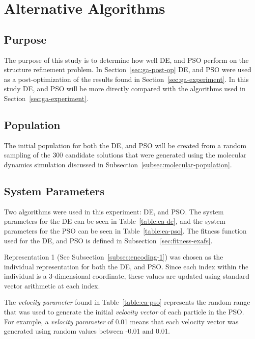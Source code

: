 \section{Alternative Algorithms}

\subsection{Purpose}

The purpose of this study is to determine how well DE, and PSO perform on the structure refinement problem. In Section~\ref{sec:ga-post-op} DE, and PSO were used as a post-optimization of the results found in Section~\ref{sec:ga-experiment}. In this study DE, and PSO will be more directly compared with the algorithms used in Section~\ref{sec:ga-experiment}.

\subsection{Population}

The initial population for both the DE, and PSO will be created from a random sampling of the 300 candidate solutions that were generated using the molecular dynamics simulation discussed in Subsection~\ref{subsec:molecular-population}.

\subsection{System Parameters}

Two algorithms were used in this experiment: DE, and PSO. The system parameters for the DE can be seen in Table~\ref{table:ea-de}, and the system parameters for the PSO can be seen in Table~\ref{table:ea-pso}. The fitness function used for the DE, and PSO is defined in Subsection~\ref{sec:fitness-exafs}.

Representation 1 (See Subsection~\ref{subsec:encoding-1}) was chosen as the individual representation for both the DE, and PSO. Since each index within the individual is a 3-dimensional coordinate, these values are updated using standard vector arithmetic at each index.

The \textit{velocity parameter} found in Table~\ref{table:ea-pso} represents the random range that was used to generate the initial \textit{velocity vector} of each particle in the PSO. For example, a \textit{velocity parameter} of 0.01 means that each velocity vector was generated using random values between -0.01 and 0.01.

